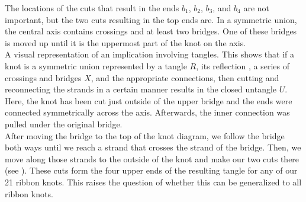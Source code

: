 \begin{paper}
The locations of the cuts that result in the ends $b_1$, $b_2$, $b_3$, and
$b_4$ are not important, but the two cuts resulting in the top ends are.
In a symmetric union, the central axis contains crossings and at least two
bridges.
One of these bridges is moved up until it is the uppermost part of the knot on
the axis.\newsavebox{\knotR}\\

{A visual representation of an implication involving tangles.
This shows that if a knot is a symmetric union represented by a tangle $R$, its
reflection \usebox{\knotR}, a series of crossings and bridges $X$, and the
appropriate connections, then cutting and reconnecting the strands in a certain
manner results in the closed untangle $U$.
Here, the knot has been cut just outside of the upper bridge and the ends were
connected symmetrically across the axis.
Afterwards, the inner connection was pulled under the original bridge.}\\

After moving the bridge to the top of the knot diagram, we follow the bridge
both ways until we reach a strand that crosses the strand of the bridge.
Then, we move along those strands to the outside of the knot and make our two
cuts there (see \figQuestion).
These cuts form the four upper ends of the resulting tangle for any of our 21
ribbon knots.
This raises the question of whether this can be generalized to all ribbon
knots.


\end{paper}
